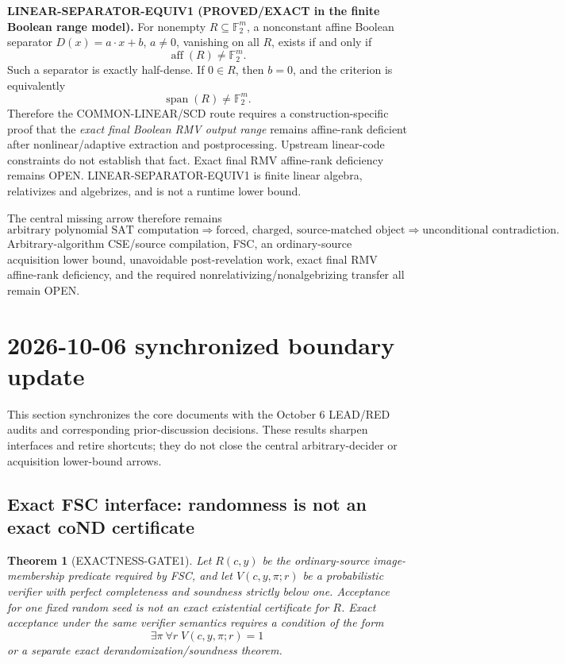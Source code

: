 \documentclass[11pt]{article}
\theoremstyle{plain}
\newtheorem{theorem}{Theorem}[section]
\theoremstyle{definition}
\theoremstyle{remark}
\begin{document}
\textbf{LINEAR-SEPARATOR-EQUIV1 (PROVED/EXACT in the finite Boolean range
model).}
For nonempty \(R\subseteq\mathbb F_2^m\), a nonconstant affine Boolean
separator \(D(x)=a\cdot x+b\), \(a\ne0\), vanishing on all \(R\), exists if
and only if
\[
\operatorname{aff}(R)\ne\mathbb F_2^m.
\]
Such a separator is exactly half-dense.  If \(0\in R\), then \(b=0\), and the
criterion is equivalently
\[
\operatorname{span}(R)\ne\mathbb F_2^m.
\]
Therefore the COMMON-LINEAR/SCD route requires a construction-specific proof
that the \emph{exact final Boolean RMV output range} remains affine-rank
deficient after nonlinear/adaptive extraction and postprocessing.  Upstream
linear-code constraints do not establish that fact.  Exact final RMV
affine-rank deficiency remains OPEN.  LINEAR-SEPARATOR-EQUIV1 is finite linear
algebra, relativizes and algebrizes, and is not a runtime lower bound.

The central missing arrow therefore remains
\[
\boxed{
\text{arbitrary polynomial SAT computation}
\Longrightarrow
\text{forced, charged, source-matched object}
\Longrightarrow
\text{unconditional contradiction}.
}
\]
Arbitrary-algorithm CSE/source compilation, FSC, an ordinary-source acquisition
lower bound, unavoidable post-revelation work, exact final RMV affine-rank
deficiency, and the required nonrelativizing/nonalgebrizing transfer all remain
OPEN.

\section{2026-10-06 synchronized boundary update}

This section synchronizes the core documents with the October 6 LEAD/RED
audits and corresponding prior-discussion decisions. These results sharpen
interfaces and retire shortcuts; they do not close the central
arbitrary-decider or acquisition lower-bound arrows.

\subsection{Exact FSC interface: randomness is not an exact coND certificate}

\begin{theorem}[EXACTNESS-GATE1]
Let \(R(c,y)\) be the ordinary-source image-membership predicate required by
FSC, and let \(V(c,y,\pi;r)\) be a probabilistic verifier with perfect
completeness and soundness strictly below one. Acceptance for one fixed random
seed is not an exact existential certificate for \(R\). Exact acceptance
under the same verifier semantics requires a condition of the form
\[
\exists \pi\ \forall r\; V(c,y,\pi;r)=1
\]
or a separate exact derandomization/soundness theorem.
\end{theorem}
\end{document}
